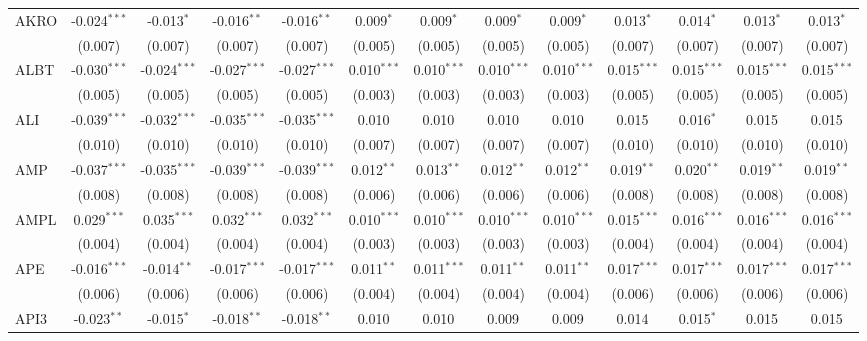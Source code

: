 \begin{table}[!htbp]
\begin{tabular}{@{\extracolsep{5pt}}lcccccccccccc}
 AKRO & -0.024$^{***}$ & -0.013$^{*}$ & -0.016$^{**}$ & -0.016$^{**}$ & 0.009$^{*}$ & 0.009$^{*}$ & 0.009$^{*}$ & 0.009$^{*}$ & 0.013$^{*}$ & 0.014$^{*}$ & 0.013$^{*}$ & 0.013$^{*}$ \\
  & (0.007) & (0.007) & (0.007) & (0.007) & (0.005) & (0.005) & (0.005) & (0.005) & (0.007) & (0.007) & (0.007) & (0.007) \\
 ALBT & -0.030$^{***}$ & -0.024$^{***}$ & -0.027$^{***}$ & -0.027$^{***}$ & 0.010$^{***}$ & 0.010$^{***}$ & 0.010$^{***}$ & 0.010$^{***}$ & 0.015$^{***}$ & 0.015$^{***}$ & 0.015$^{***}$ & 0.015$^{***}$ \\
  & (0.005) & (0.005) & (0.005) & (0.005) & (0.003) & (0.003) & (0.003) & (0.003) & (0.005) & (0.005) & (0.005) & (0.005) \\
 ALI & -0.039$^{***}$ & -0.032$^{***}$ & -0.035$^{***}$ & -0.035$^{***}$ & 0.010$^{}$ & 0.010$^{}$ & 0.010$^{}$ & 0.010$^{}$ & 0.015$^{}$ & 0.016$^{*}$ & 0.015$^{}$ & 0.015$^{}$ \\
  & (0.010) & (0.010) & (0.010) & (0.010) & (0.007) & (0.007) & (0.007) & (0.007) & (0.010) & (0.010) & (0.010) & (0.010) \\
 AMP & -0.037$^{***}$ & -0.035$^{***}$ & -0.039$^{***}$ & -0.039$^{***}$ & 0.012$^{**}$ & 0.013$^{**}$ & 0.012$^{**}$ & 0.012$^{**}$ & 0.019$^{**}$ & 0.020$^{**}$ & 0.019$^{**}$ & 0.019$^{**}$ \\
  & (0.008) & (0.008) & (0.008) & (0.008) & (0.006) & (0.006) & (0.006) & (0.006) & (0.008) & (0.008) & (0.008) & (0.008) \\
 AMPL & 0.029$^{***}$ & 0.035$^{***}$ & 0.032$^{***}$ & 0.032$^{***}$ & 0.010$^{***}$ & 0.010$^{***}$ & 0.010$^{***}$ & 0.010$^{***}$ & 0.015$^{***}$ & 0.016$^{***}$ & 0.016$^{***}$ & 0.016$^{***}$ \\
  & (0.004) & (0.004) & (0.004) & (0.004) & (0.003) & (0.003) & (0.003) & (0.003) & (0.004) & (0.004) & (0.004) & (0.004) \\
 APE & -0.016$^{***}$ & -0.014$^{**}$ & -0.017$^{***}$ & -0.017$^{***}$ & 0.011$^{**}$ & 0.011$^{***}$ & 0.011$^{**}$ & 0.011$^{**}$ & 0.017$^{***}$ & 0.017$^{***}$ & 0.017$^{***}$ & 0.017$^{***}$ \\
  & (0.006) & (0.006) & (0.006) & (0.006) & (0.004) & (0.004) & (0.004) & (0.004) & (0.006) & (0.006) & (0.006) & (0.006) \\
 API3 & -0.023$^{**}$ & -0.015$^{*}$ & -0.018$^{**}$ & -0.018$^{**}$ & 0.010$^{}$ & 0.010$^{}$ & 0.009$^{}$ & 0.009$^{}$ & 0.014$^{}$ & 0.015$^{*}$ & 0.015$^{}$ & 0.015$^{}$ \\

\end{tabular}
\end{table}
